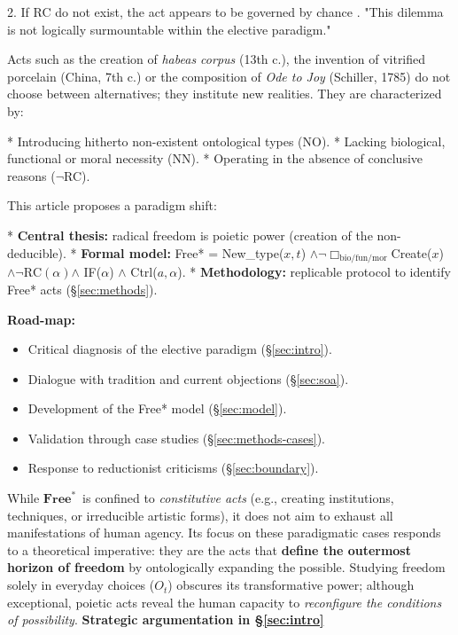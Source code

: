 \documentclass[11pt,a4paper]{article}
\newcommand{\Free}{\ensuremath{\mathbf{Free}^{\ast}}}
\begin{document}
2. If RC do not exist, the act appears to be governed by chance \cite[ p. 15]{frankfurt1971}. "This dilemma is not logically surmountable within the elective paradigm." \cite[ p. 387]{lavin2021}

Acts such as the creation of \emph{habeas corpus} (13th c.), the invention of vitrified porcelain (China, 7th c.) or the composition of \emph{Ode to Joy} (Schiller, 1785) do not choose between alternatives; they institute new realities. They are characterized by:

* Introducing hitherto non-existent ontological types (NO).
* Lacking biological, functional or moral necessity (NN).
* Operating in the absence of conclusive reasons (\(\neg\)RC).

This article proposes a paradigm shift:

* \textbf{Central thesis:} radical freedom is poietic power (creation of the non-deducible).
* \textbf{Formal model:} Free* = New_type(\(x,t\)) \(\land\neg\Box_{\text{bio/fun/mor}}\)Create(\(x\)) \(\land\neg\text{RC}(\alpha)\)\(\land\) IF(\(\alpha\)) \(\land\) Ctrl(\(a,\alpha\)).
* \textbf{Methodology:} replicable protocol to identify Free* acts (\S\ref{sec:methods}).

\textbf{Road-map:}
\begin{itemize}
  \item Critical diagnosis of the elective paradigm (\S\ref{sec:intro}).
  \item Dialogue with tradition and current objections (\S\ref{sec:soa}).
  \item Development of the Free* model (\S\ref{sec:model}).
  \item Validation through case studies (\S\ref{sec:methods-cases}).
  \item Response to reductionist criticisms (\S\ref{sec:boundary}).
\end{itemize}

While \Free\ is confined to \emph{constitutive acts} (e.g., creating institutions, techniques, or irreducible artistic forms), it does not aim to exhaust all manifestations of human agency. Its focus on these paradigmatic cases responds to a theoretical imperative: they are the acts that \textbf{define the outermost horizon of freedom} by ontologically expanding the possible. Studying freedom solely in everyday choices (\(O_{t}\)) obscures its transformative power; although exceptional, poietic acts reveal the human capacity to \emph{reconfigure the conditions of possibility}. \textbf{Strategic argumentation in \S\ref{sec:intro}}
\end{document}
